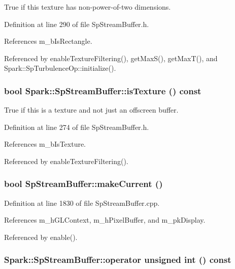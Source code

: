 True if this texture has non-power-of-two dimensions. 

Definition at line 290 of file Sp\-Stream\-Buffer.h.

References m\_\-b\-Is\-Rectangle.

Referenced by enable\-Texture\-Filtering(), get\-Max\-S(), get\-Max\-T(), and Spark::Sp\-Turbulence\-Op::initialize().
\subsubsection{\setlength{\rightskip}{0pt plus 5cm}bool Spark::Sp\-Stream\-Buffer::is\-Texture () const\hspace{0.3cm}{\tt  [inline]}}\label{classSpark_1_1SpStreamBuffer_a31}


True if this is a texture and not just an offscreen buffer. 

Definition at line 274 of file Sp\-Stream\-Buffer.h.

References m\_\-b\-Is\-Texture.

Referenced by enable\-Texture\-Filtering().
\subsubsection{\setlength{\rightskip}{0pt plus 5cm}bool Sp\-Stream\-Buffer::make\-Current ()\hspace{0.3cm}{\tt  [protected]}}\label{classSpark_1_1SpStreamBuffer_b8}


Definition at line 1830 of file Sp\-Stream\-Buffer.cpp.

References m\_\-h\-GLContext, m\_\-h\-Pixel\-Buffer, and m\_\-pk\-Display.

Referenced by enable().
\subsubsection{\setlength{\rightskip}{0pt plus 5cm}Spark::Sp\-Stream\-Buffer::operator unsigned int () const\hspace{0.3cm}{\tt  [inline]}}\label{classSpark_1_1SpStreamBuffer_a18}


